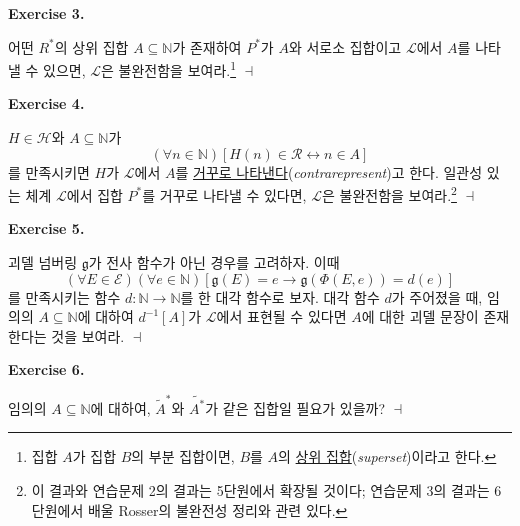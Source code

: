 \documentclass[12pt]{paper}
\newcommand{\gnum}
{ \mathfrak{g}
}
\newenvironment{context}[1][]
{ \noindent \textbf{{#1}.}
}
{ \hfill $ \dashv $
}
\begin{document}
\begin{context}[Exercise 3]
어떤 $R^{*}$의 상위 집합 $A \subseteq \mathbb{N}$가 존재하여 $P^{*}$가 $A$와 서로소 집합이고 $\mathcal{L}$에서 $A$를 나타낼 수 있으면,
$\mathcal{L}$은 불완전함을 보여라.\footnote
{
집합 $A$가 집합 $B$의 부분 집합이면, $B$를 $A$의 \underline{상위 집합}(\textit{superset})이라고 한다.
}
\end{context}

\begin{context}[Exercise 4]
$H \in \mathcal{H}$와 $A \subseteq \mathbb{N}$가
$$ \left( \forall n \in \mathbb{N} \right) \left[ H \left( n \right) \in \mathcal{R} \leftrightarrow n \in A \right] $$를 만족시키면
$H$가 $\mathcal{L}$에서 $A$를 \underline{거꾸로 나타낸다}(\textit{contrarepresent})고 한다.
일관성 있는 체계 $\mathcal{L}$에서 집합 $P^{*}$를 거꾸로 나타낼 수 있다면,
$\mathcal{L}$은 불완전함을 보여라.\footnote
{
이 결과와 연습문제 2의 결과는 5단원에서 확장될 것이다;
연습문제 3의 결과는 6단원에서 배울 Rosser의 불완전성 정리와 관련 있다.
}
\end{context}

\begin{context}[Exercise 5]
괴델 넘버링 $\gnum$가 전사 함수가 아닌 경우를 고려하자.
이때 $$ \left( \forall E \in \mathcal{E} \right) \left( \forall e \in \mathbb{N} \right) \left[ \gnum \left( E \right) = e \rightarrow \gnum \left( \Phi \left( E , e \right) \right) = d \left( e \right) \right] $$를
만족시키는 함수 $d : \mathbb{N} \to \mathbb{N}$를 한 대각 함수로 보자.
대각 함수 $d$가 주어졌을 때, 임의의 $A \subseteq \mathbb{N}$에 대하여 $d^{-1} \left[ A \right]$가 $\mathcal{L}$에서 표현될 수 있다면 $A$에 대한 괴델 문장이 존재한다는 것을 보여라.
\end{context}

\begin{context}[Exercise 6]
임의의 $A \subseteq \mathbb{N}$에 대하여,
$\tilde{A}^{*}$와 $\widetilde{A^{*}}$가 같은 집합일 필요가 있을까?
\end{context}
\end{document}
